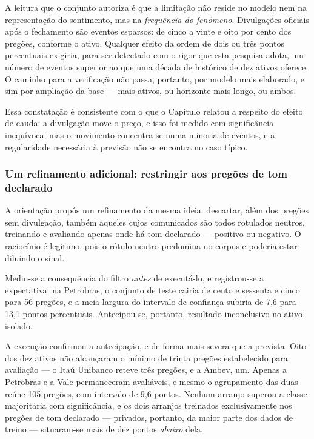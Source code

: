A leitura que o conjunto autoriza é que a limitação não reside no modelo nem na representação do
sentimento, mas na \emph{frequência do fenômeno}. Divulgações oficiais após o fechamento são
eventos esparsos: de cinco a vinte e oito por cento dos pregões, conforme o ativo. Qualquer efeito
da ordem de dois ou três pontos percentuais exigiria, para ser detectado com o rigor que esta
pesquisa adota, um número de eventos superior ao que uma década de histórico de dez ativos
oferece. O caminho para a verificação não passa, portanto, por modelo mais elaborado, e sim por
ampliação da base --- mais ativos, ou horizonte mais longo, ou ambos.

Essa constatação é consistente com o que o Capítulo relatou a respeito do efeito de cauda: a
divulgação move o preço, e isso foi medido com significância inequívoca; mas o movimento concentra-se
numa minoria de eventos, e a regularidade necessária à previsão não se encontra no caso típico.

\subsubsection{Um refinamento adicional: restringir aos pregões de tom declarado}

A orientação propôs um refinamento da mesma ideia: descartar, além dos pregões sem divulgação,
também aqueles cujos comunicados são todos rotulados neutros, treinando e avaliando apenas onde há
tom declarado --- positivo ou negativo. O raciocínio é legítimo, pois o rótulo neutro predomina no
corpus e poderia estar diluindo o sinal.

Mediu-se a consequência do filtro \emph{antes} de executá-lo, e registrou-se a expectativa: na
Petrobras, o conjunto de teste cairia de cento e sessenta e cinco para 56 pregões, e a
meia-largura do intervalo de confiança subiria de 7{,}6 para 13{,}1 pontos percentuais.
Antecipou-se, portanto, resultado inconclusivo no ativo isolado.

A execução confirmou a antecipação, e de forma mais severa que a prevista. Oito dos dez ativos não
alcançaram o mínimo de trinta pregões estabelecido para avaliação --- o Itaú Unibanco reteve três
pregões, e a Ambev, um. Apenas a Petrobras e a Vale permaneceram avaliáveis, e mesmo o agrupamento
das duas reúne 105 pregões, com intervalo de 9{,}6 pontos. Nenhum arranjo
superou a classe majoritária com significância, e os dois arranjos treinados exclusivamente nos
pregões de tom declarado --- privados, portanto, da maior parte dos dados de treino --- situaram-se
mais de dez pontos \emph{abaixo} dela.


